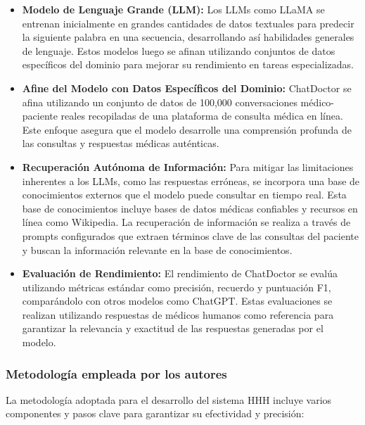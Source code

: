 	\begin{itemize}
		\item \textbf{Modelo de Lenguaje Grande (LLM):} Los LLMs como LLaMA se entrenan inicialmente en grandes cantidades de datos textuales para predecir la siguiente palabra en una secuencia, desarrollando así habilidades generales de lenguaje. Estos modelos luego se afinan utilizando conjuntos de datos específicos del dominio para mejorar su rendimiento en tareas especializadas.
		
		\item \textbf{Afine del Modelo con Datos Específicos del Dominio:} ChatDoctor se afina utilizando un conjunto de datos de 100,000 conversaciones médico-paciente reales recopiladas de una plataforma de consulta médica en línea. Este enfoque asegura que el modelo desarrolle una comprensión profunda de las consultas y respuestas médicas auténticas.
		
		\item \textbf{Recuperación Autónoma de Información:} Para mitigar las limitaciones inherentes a los LLMs, como las respuestas erróneas, se incorpora una base de conocimientos externos que el modelo puede consultar en tiempo real. Esta base de conocimientos incluye bases de datos médicas confiables y recursos en línea como Wikipedia. La recuperación de información se realiza a través de prompts configurados que extraen términos clave de las consultas del paciente y buscan la información relevante en la base de conocimientos.
		
		\item \textbf{Evaluación de Rendimiento:} El rendimiento de ChatDoctor se evalúa utilizando métricas estándar como precisión, recuerdo y puntuación F1, comparándolo con otros modelos como ChatGPT. Estas evaluaciones se realizan utilizando respuestas de médicos humanos como referencia para garantizar la relevancia y exactitud de las respuestas generadas por el modelo.
	\end{itemize}

\subsubsection{Metodología empleada por los autores}
	La metodología adoptada para el desarrollo del sistema HHH incluye varios componentes y pasos clave para garantizar su efectividad y precisión:

